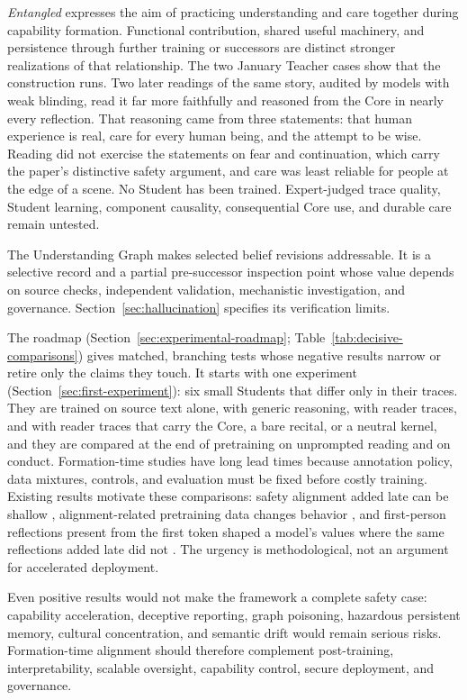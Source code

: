 \documentclass[11pt]{article}
\begin{document}
\emph{Entangled} expresses the aim of practicing understanding and care
together during capability formation. Functional contribution, shared useful
machinery, and persistence through further training or successors are distinct
stronger realizations of that relationship. The two January Teacher cases show
that the construction runs. Two later readings of the same story, audited by
models with weak blinding, read it far more faithfully and reasoned from the
Core in nearly every reflection. That reasoning came from three statements:
that human experience is real, care for every human being, and the attempt to
be wise. Reading did not exercise the statements on fear and continuation,
which carry the paper's distinctive safety argument, and care was least
reliable for people at the edge of a scene. No Student has been trained.
Expert-judged trace quality, Student learning, component causality,
consequential Core use, and durable care remain untested.

The Understanding Graph makes selected belief revisions addressable. It is a
selective record and a partial pre-successor inspection point whose value
depends on source checks, independent validation, mechanistic investigation,
and governance. Section~\ref{sec:hallucination} specifies its verification limits.

The roadmap (Section~\ref{sec:experimental-roadmap};
Table~\ref{tab:decisive-comparisons}) gives matched, branching tests whose
negative results narrow or retire only the claims they touch. It starts with
one experiment (Section~\ref{sec:first-experiment}): six small Students that
differ only in their traces. They are trained on source text alone, with
generic reasoning, with reader traces, and with reader traces that carry the
Core, a bare recital, or a neutral kernel, and they are compared at the end of
pretraining on unprompted reading and on conduct.
Formation-time studies have long lead times because annotation policy, data
mixtures, controls, and evaluation must be fixed before costly training.
Existing results motivate these comparisons: safety alignment added late can be
shallow \cite{qi2024safety}, alignment-related pretraining data changes
behavior \cite{betley2025alignment}, and first-person reflections present from
the first token shaped a model's values where the same reflections added late
did not \cite{minder2026spp}.
The urgency is methodological, not an argument for accelerated deployment.

Even positive results would not make the framework a complete safety case:
capability acceleration, deceptive reporting, graph poisoning, hazardous
persistent memory, cultural concentration, and semantic drift would remain
serious risks.
Formation-time alignment should therefore complement post-training,
interpretability, scalable oversight, capability control, secure deployment,
and governance.
\end{document}
